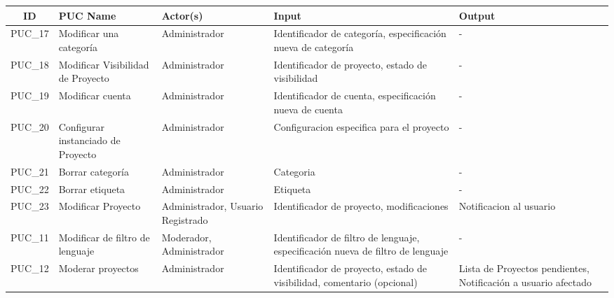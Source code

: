 \begin{table}[!ht]
\begin{tabular}{|c|p{2.5cm}|p{2.5cm}|p{2.5cm}|p{6cm}|}
\hline         
ID & PUC Name & Actor(s) & Input & Output \\ \hline
PUC\_17 & Modificar una categor\'ia & Administrador & Identificador de categor\'ia, especificaci\'on nueva de categor\'ia & - \\ \hline
PUC\_18 & Modificar Visibilidad de Proyecto & Administrador & Identificador de proyecto, estado de visibilidad & - \\ \hline
PUC\_19 & Modificar cuenta & Administrador & Identificador de cuenta, especificaci\'on nueva de cuenta & - \\ \hline
PUC\_20 & Configurar instanciado de Proyecto & Administrador & Configuracion especifica para el proyecto & - \\ \hline
PUC\_21 & Borrar categor\'ia & Administrador & Categoria & - \\ \hline
PUC\_22 & Borrar etiqueta & Administrador & Etiqueta & - \\ \hline
PUC\_23 & Modificar Proyecto & Administrador, Usuario Registrado & Identificador de proyecto, modificaciones & Notificacion al usuario \\ \hline
PUC\_11 & Modificar de filtro de lenguaje & Moderador, Administrador & Identificador de filtro de lenguaje, especificaci\'on nueva de filtro de lenguaje & - \\ \hline
PUC\_12 & Moderar proyectos & Administrador & Identificador de proyecto, estado de visibilidad, comentario (opcional) & Lista de Proyectos pendientes, Notificaci\'on a usuario afectado \\ \hline
\end{tabular}
\end{table}